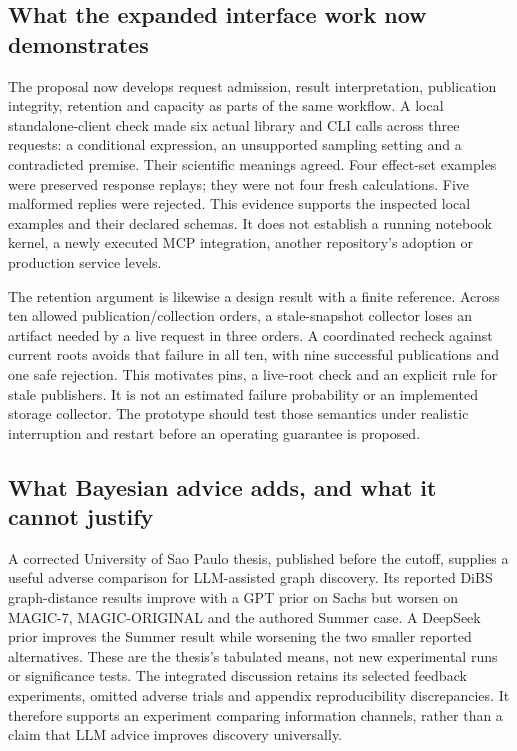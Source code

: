 \hypertarget{what-the-expanded-interface-work-now-demonstrates}{%
\subsection{What the expanded interface work now
demonstrates}\label{what-the-expanded-interface-work-now-demonstrates}}

The proposal now develops request admission, result interpretation,
publication integrity, retention and capacity as parts of the same
workflow. A local standalone-client check made six actual library and
CLI calls across three requests: a conditional expression, an
unsupported sampling setting and a contradicted premise. Their
scientific meanings agreed. Four effect-set examples were preserved
response replays; they were not four fresh calculations. Five malformed
replies were rejected. This evidence supports the inspected local
examples and their declared schemas. It does not establish a running
notebook kernel, a newly executed MCP integration, another repository's
adoption or production service levels. \citep{sp18_clients}

The retention argument is likewise a design result with a finite
reference. Across ten allowed publication/collection orders, a
stale-snapshot collector loses an artifact needed by a live request in
three orders. A coordinated recheck against current roots avoids that
failure in all ten, with nine successful publications and one safe
rejection. This motivates pins, a live-root check and an explicit rule
for stale publishers. It is not an estimated failure probability or an
implemented storage collector. The prototype should test those semantics
under realistic interruption and restart before an operating guarantee
is proposed. \citep{sp18_retention}

\hypertarget{what-bayesian-advice-adds-and-what-it-cannot-justify}{%
\subsection{What Bayesian advice adds, and what it cannot
justify}\label{what-bayesian-advice-adds-and-what-it-cannot-justify}}

A corrected University of Sao Paulo thesis, published before the cutoff,
supplies a useful adverse comparison for LLM-assisted graph discovery.
Its reported DiBS graph-distance results improve with a GPT prior on
Sachs but worsen on MAGIC-7, MAGIC-ORIGINAL and the authored Summer
case. A DeepSeek prior improves the Summer result while worsening the
two smaller reported alternatives. These are the thesis's tabulated
means, not new experimental runs or significance tests. The integrated
discussion retains its selected feedback experiments, omitted adverse
trials and appendix reproducibility discrepancies. It therefore supports
an experiment comparing information channels, rather than a claim that
LLM advice improves discovery universally. \citep{exec18_videira_thesis}

